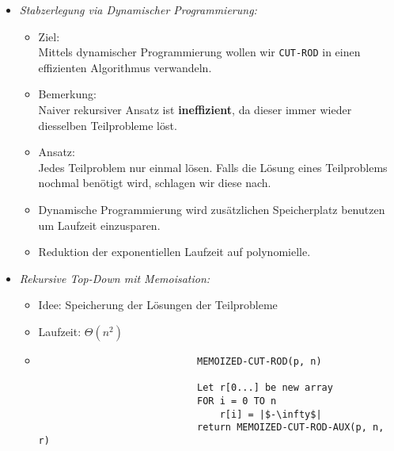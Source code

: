 \begin{itemize}
\begin{itemize}
\begin{itemize}
\begin{verbatim}
                            IF n== 0
                                return 0;
                            q = |$-\infty$|;
                            FOR i = 1 TO n  // nicht Start bei 0, sonst kein Rekursionsschritt
                                q = max(q, p[i] + CUT-ROD(p, n - i));
                            return q;
                            \end{verbatim}
                    \end{itemize}
                \item \textit{Stabzerlegung via Dynamischer Programmierung:}
                    \begin{itemize}
                        \item Ziel: \\
                                Mittels dynamischer Programmierung wollen wir \texttt{CUT-ROD} in einen effizienten
                                Algorithmus verwandeln.
                        \item Bemerkung: \\
                                Naiver rekursiver Ansatz ist \textbf{ineffizient}, da dieser immer wieder diesselben 
                                Teilprobleme löst.
                        \item Ansatz: \\
                                Jedes Teilproblem nur einmal lösen. Falls die Lösung eines Teilproblems nochmal benötigt
                                wird, schlagen wir diese nach.
                        \item Dynamische Programmierung wird zusätzlichen Speicherplatz benutzen um Laufzeit einzusparen.
                        \item Reduktion der exponentiellen Laufzeit auf polynomielle.
                    \end{itemize}
                \item \textit{Rekursive Top-Down mit Memoisation:}
                    \begin{itemize}
                        \item Idee: Speicherung der Lösungen der Teilprobleme
                        \item Laufzeit: $\Theta(n^2)$
                        \item[]
                            \begin{verbatim}
                            MEMOIZED-CUT-ROD(p, n)

                            Let r[0...] be new array
                            FOR i = 0 TO n
                                r[i] = |$-\infty$|
                            return MEMOIZED-CUT-ROD-AUX(p, n, r)



\end{verbatim}
\end{itemize}
\end{itemize}
\end{itemize}
